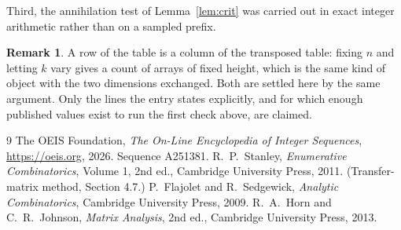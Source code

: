 \documentclass[11pt,a4paper]{article}
\theoremstyle{plain}
\theoremstyle{definition}
\newtheorem{remark}[theorem]{Remark}
\begin{document}
Third, the annihilation test of Lemma~\ref{lem:crit} was carried out in exact integer
arithmetic rather than on a sampled prefix.

\begin{remark}
A row of the table is a column of the transposed table: fixing $n$ and letting $k$ vary gives a
count of arrays of fixed height, which is the same kind of object with the two dimensions
exchanged. Both are settled here by the same argument. Only the lines the entry states
explicitly, and for which enough published values exist to run the first check above, are
claimed.
\end{remark}

\begin{thebibliography}{9}
 The OEIS Foundation, \emph{The On-Line Encyclopedia of Integer
Sequences}, \url{https://oeis.org}, 2026. Sequence A251381.
 R.~P.~Stanley, \emph{Enumerative Combinatorics}, Volume 1, 2nd ed.,
Cambridge University Press, 2011. (Transfer-matrix method, Section 4.7.)
 P.~Flajolet and R.~Sedgewick, \emph{Analytic Combinatorics}, Cambridge
University Press, 2009.
 R.~A.~Horn and C.~R.~Johnson, \emph{Matrix Analysis}, 2nd ed., Cambridge
University Press, 2013.
\end{thebibliography}
\end{document}
